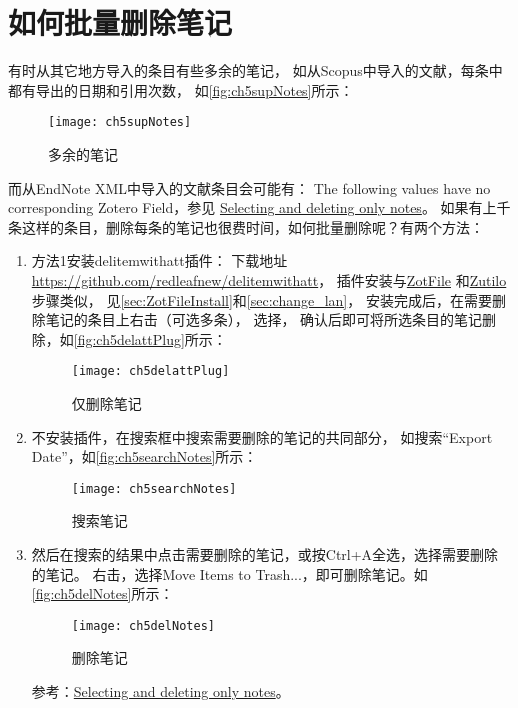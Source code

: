 \documentclass[cn,11pt,chinese]{elegantbook}
\begin{document}
		\section{如何批量删除笔记}\label{sec:batchDelNotes}
			有时从其它地方导入的条目有些多余的笔记，
			如从Scopus中导入的文献，每条中都有导出的日期和引用次数，
			如\autoref{fig:ch5supNotes}所示：
				\begin{figure}[htbp]
					\centering
					\texttt{[image: ch5supNotes]}
					\caption{多余的笔记}
					\label{fig:ch5supNotes}
				\end{figure}
				而从EndNote XML中导入的文献条目会可能有：
				The following values have no corresponding Zotero Field，参见
				\href{https://forums.zotero.org/discussion/comment/390716#Comment_390716}{Selecting and deleting only notes}。
				如果有上千条这样的条目，删除每条的笔记也很费时间，如何批量删除呢？有两个方法：
					\begin{enumerate}
						\item 方法1安装delitemwithatt插件：
						下载地址\href{https://github.com/redleafnew/delitemwithatt}{https://github.com/redleafnew/delitemwithatt}，
						插件安装与\href{http://zotfile.com/}{ZotFile}
						和\href{https://github.com/wshanks/Zutilo/releases}{Zutilo}步骤类似，
						见\cref{sec:ZotFileInstall}和\cref{sec:change_lan}，
						安装完成后，在需要删除笔记的条目上右击（可选多条），
						选择，
						确认后即可将所选条目的笔记删除，如\autoref{fig:ch5delattPlug}所示：
							\begin{figure}[htbp]
								\centering
								\texttt{[image: ch5delattPlug]}
								\caption{仅删除笔记}
								\label{fig:ch5delattPlug}
							\end{figure}
						
						\item 不安装插件，在搜索框中搜索需要删除的笔记的共同部分，
						如搜索“Export Date”，如\autoref{fig:ch5searchNotes}所示：

							\begin{figure}[htbp]
								\centering
								\texttt{[image: ch5searchNotes]}
								\caption{搜索笔记}
								\label{fig:ch5searchNotes}
							\end{figure}
						\item 然后在搜索的结果中点击需要删除的笔记，或按Ctrl+A全选，选择需要删除的笔记。
						右击，选择Move Items to Trash...，即可删除笔记。如\autoref{fig:ch5delNotes}所示：
					
							\begin{figure}[htbp]
								\centering
								\texttt{[image: ch5delNotes]}
								\caption{删除笔记}
								\label{fig:ch5delNotes}
							\end{figure}
				
					参考：\href{https://forums.zotero.org/discussion/comment/390716#Comment_390716}{Selecting and deleting only notes}。
				\end{enumerate}
\end{document}
